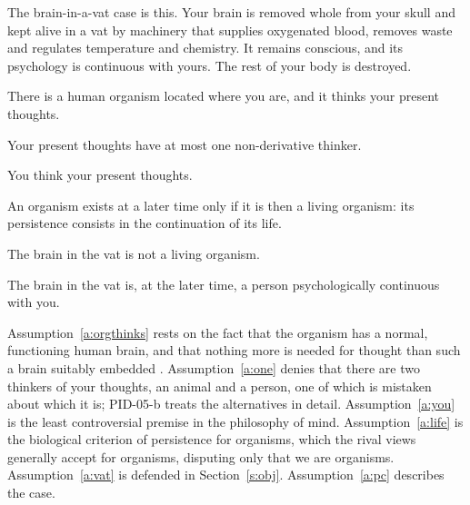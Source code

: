 \documentclass{situationist-preprint}
\begin{document}
The brain-in-a-vat case is this. Your brain is removed whole from your skull and kept alive in a vat by machinery that supplies oxygenated blood, removes waste and regulates temperature and chemistry. It remains conscious, and its psychology is continuous with yours. The rest of your body is destroyed.

\begin{assumption}\label{a:orgthinks}
There is a human organism located where you are, and it thinks your present thoughts.
\end{assumption}

\begin{assumption}\label{a:one}
Your present thoughts have at most one non-derivative thinker.
\end{assumption}

\begin{assumption}\label{a:you}
You think your present thoughts.
\end{assumption}

\begin{assumption}\label{a:life}
An organism exists at a later time only if it is then a living organism: its persistence consists in the continuation of its life.
\end{assumption}

\begin{assumption}\label{a:vat}
The brain in the vat is not a living organism.
\end{assumption}

\begin{assumption}\label{a:pc}
The brain in the vat is, at the later time, a person psychologically continuous with you.
\end{assumption}

Assumption~\ref{a:orgthinks} rests on the fact that the organism has a normal, functioning human brain, and that nothing more is needed for thought than such a brain suitably embedded \citep{Olson1997}. Assumption~\ref{a:one} denies that there are two thinkers of your thoughts, an animal and a person, one of which is mistaken about which it is; PID-05-b treats the alternatives in detail. Assumption~\ref{a:you} is the least controversial premise in the philosophy of mind. Assumption~\ref{a:life} is the biological criterion of persistence for organisms, which the rival views generally accept for organisms, disputing only that we are organisms. Assumption~\ref{a:vat} is defended in Section~\ref{s:obj}. Assumption~\ref{a:pc} describes the case.
\end{document}

